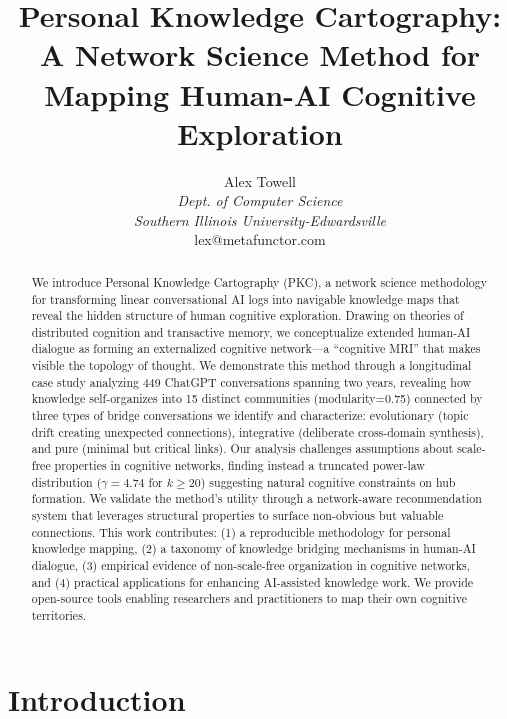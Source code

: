 \documentclass[10pt, a4paper]{article}
\begin{document}
\title{Personal Knowledge Cartography: A Network Science Method for Mapping Human-AI Cognitive Exploration}

\author{Alex Towell\\
\textit{Dept. of Computer Science}\\
\textit{Southern Illinois University-Edwardsville}\\
lex@metafunctor.com
}

\maketitle


\begin{abstract}
We introduce Personal Knowledge Cartography (PKC), a network science methodology for transforming linear conversational AI logs into navigable knowledge maps that reveal the hidden structure of human cognitive exploration. Drawing on theories of distributed cognition and transactive memory, we conceptualize extended human-AI dialogue as forming an externalized cognitive network—a ``cognitive MRI'' that makes visible the topology of thought. We demonstrate this method through a longitudinal case study analyzing 449 ChatGPT conversations spanning two years, revealing how knowledge self-organizes into 15 distinct communities (modularity=0.75) connected by three types of bridge conversations we identify and characterize: evolutionary (topic drift creating unexpected connections), integrative (deliberate cross-domain synthesis), and pure (minimal but critical links). Our analysis challenges assumptions about scale-free properties in cognitive networks, finding instead a truncated power-law distribution ($\gamma = 4.74$ for $k \geq 20$) suggesting natural cognitive constraints on hub formation. We validate the method's utility through a network-aware recommendation system that leverages structural properties to surface non-obvious but valuable connections. This work contributes: (1) a reproducible methodology for personal knowledge mapping, (2) a taxonomy of knowledge bridging mechanisms in human-AI dialogue, (3) empirical evidence of non-scale-free organization in cognitive networks, and (4) practical applications for enhancing AI-assisted knowledge work. We provide open-source tools enabling researchers and practitioners to map their own cognitive territories.
\end{abstract}

\section{Introduction}
\end{document}
